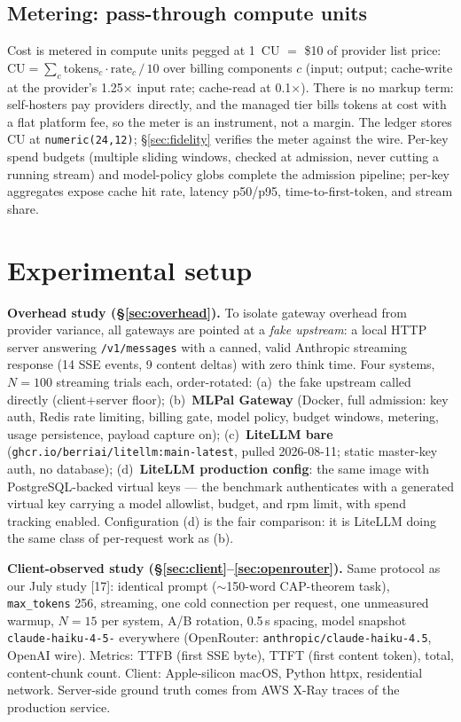 \documentclass[10pt]{article}
\newcommand{\head}[1]{\textbf{#1}}
\begin{document}
\subsection{Metering: pass-through compute units}
Cost is metered in compute units pegged at 1~CU $=$ \$10 of provider list price:
$\mathrm{CU} = \sum_{c} \mathrm{tokens}_c \cdot \mathrm{rate}_c \,/\, 10$
over billing components $c$ (input; output; cache-write at the provider's 1.25$\times$ input rate; cache-read at 0.1$\times$). There is no markup term: self-hosters pay providers directly, and the managed tier bills tokens at cost with a flat platform fee, so the meter is an instrument, not a margin. The ledger stores CU at \texttt{numeric(24,12)}; \S\ref{sec:fidelity} verifies the meter against the wire. Per-key spend budgets (multiple sliding windows, checked at admission, never cutting a running stream) and model-policy globs complete the admission pipeline; per-key aggregates expose cache hit rate, latency p50/p95, time-to-first-token, and stream share.

\section{Experimental setup}\label{sec:setup}
\head{Overhead study (\S\ref{sec:overhead}).} To isolate gateway overhead from provider variance, all gateways are pointed at a \emph{fake upstream}: a local HTTP server answering \texttt{/v1/messages} with a canned, valid Anthropic streaming response (14 SSE events, 9 content deltas) with zero think time. Four systems, $N{=}100$ streaming trials each, order-rotated: (a)~the fake upstream called directly (client+server floor); (b)~\textbf{MLPal Gateway} (Docker, full admission: key auth, Redis rate limiting, billing gate, model policy, budget windows, metering, usage persistence, payload capture on); (c)~\textbf{LiteLLM bare} (\texttt{ghcr.io/berriai/litellm:main-latest}, pulled 2026-08-11; static master-key auth, no database); (d)~\textbf{LiteLLM production config}: the same image with PostgreSQL-backed virtual keys --- the benchmark authenticates with a generated virtual key carrying a model allowlist, budget, and rpm limit, with spend tracking enabled. Configuration (d) is the fair comparison: it is LiteLLM doing the same class of per-request work as (b).

\head{Client-observed study (\S\ref{sec:client}--\ref{sec:openrouter}).} Same protocol as our July study [17]: identical prompt ($\sim$150-word CAP-theorem task), \texttt{max\_tokens} 256, streaming, one cold connection per request, one unmeasured warmup, $N{=}15$ per system, A/B rotation, 0.5\,s spacing, model snapshot \texttt{claude-haiku-4-5-} everywhere (OpenRouter: \texttt{anthropic/claude-haiku-4.5}, OpenAI wire). Metrics: TTFB (first SSE byte), TTFT (first content token), total, content-chunk count. Client: Apple-silicon macOS, Python httpx, residential network. Server-side ground truth comes from AWS X-Ray traces of the production service.
\end{document}
